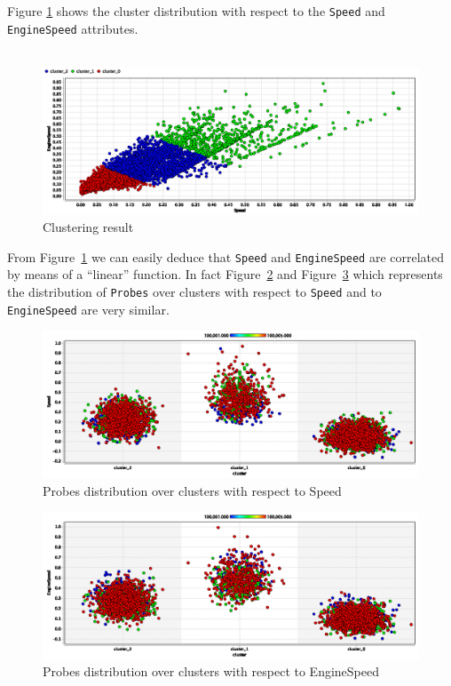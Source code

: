 Figure \ref{figure:clusters} shows the cluster distribution with respect to the \texttt{Speed} and \texttt{EngineSpeed} attributes.\\\\

\begin{figure}[h!]
\centerline{\includegraphics[width=\textwidth]{images/cluster_distrib.png}}
\caption{Clustering result}
\label{figure:clusters}
\end{figure}

From Figure~\ref{figure:clusters} we can easily deduce that \texttt{Speed} and \texttt{EngineSpeed} are correlated by means of a ``linear'' function. In fact Figure~\ref{figure:probedistspeed} and Figure~\ref{figure:probedistengspeed} which represents the distribution of \texttt{Probes} over clusters with respect to \texttt{Speed} and to \texttt{EngineSpeed} are very similar.

\begin{figure}[h!]
\centerline{\includegraphics[width=\textwidth]{images/probe_cluster_distrib_speed.png}}
\caption{Probes distribution over clusters with respect to Speed}
\label{figure:probedistspeed}
\end{figure}

\begin{figure}[h!]
\centerline{\includegraphics[width=\textwidth]{images/probe_cluster_distrib_enginespeed.png}}
\caption{Probes distribution over clusters with respect to EngineSpeed}
\label{figure:probedistengspeed}
\end{figure}

